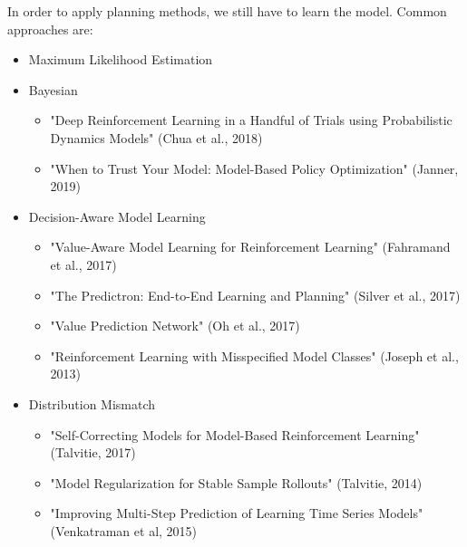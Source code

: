 		In order to apply planning methods, we still have to learn the model. Common approaches are:
		\begin{itemize}
			\item Maximum Likelihood Estimation
			\item Bayesian
				\begin{itemize}
					\item "Deep Reinforcement Learning in a Handful of Trials using Probabilistic Dynamics Models" (Chua et al., 2018)
					\item "When to Trust Your Model: Model-Based Policy Optimization" (Janner, 2019)
				\end{itemize}
			\item Decision-Aware Model Learning
				\begin{itemize}
					\item "Value-Aware Model Learning for Reinforcement Learning" (Fahramand et al., 2017)
					\item "The Predictron: End-to-End Learning and Planning" (Silver et al., 2017)
					\item "Value Prediction Network" (Oh et al., 2017)
					\item "Reinforcement Learning with Misspecified Model Classes" (Joseph et al., 2013)
				\end{itemize}
			\item Distribution Mismatch
				\begin{itemize}
					\item "Self-Correcting Models for Model-Based Reinforcement Learning" (Talvitie, 2017)
					\item "Model Regularization for Stable Sample Rollouts" (Talvitie, 2014)
					\item "Improving Multi-Step Prediction of Learning Time Series Models" (Venkatraman et al, 2015)
				\end{itemize}
		\end{itemize}

